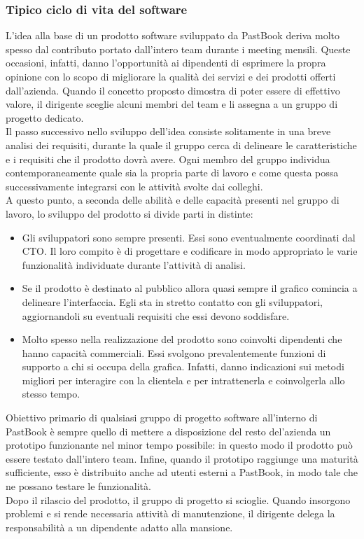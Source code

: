 			\subsubsection{Tipico ciclo di vita del software}
				L'idea alla base di un prodotto software sviluppato da PastBook deriva molto spesso dal contributo portato
				dall'intero team durante i meeting mensili. Queste occasioni, infatti, danno l'opportunità ai dipendenti di esprimere
				la propra opinione con lo scopo di migliorare la qualità dei servizi e dei prodotti offerti dall'azienda. Quando il
				concetto proposto dimostra di poter essere di effettivo valore, il dirigente sceglie alcuni membri del team e li
				assegna a un gruppo di progetto dedicato.\\
				Il passo successivo nello sviluppo dell'idea consiste solitamente in una breve analisi dei requisiti, durante la
				quale il gruppo cerca di delineare le caratteristiche e i requisiti che il prodotto dovrà avere. Ogni membro del
				gruppo individua contemporaneamente quale sia la propria parte di lavoro e come questa possa successivamente
				integrarsi con le attività svolte dai colleghi.\\
				A questo punto, a seconda delle abilità e delle capacità presenti nel gruppo di lavoro, lo sviluppo del prodotto
				si divide parti in distinte:
				\begin{itemize}
					\item Gli sviluppatori sono sempre presenti. Essi sono eventualmente coordinati dal CTO. Il loro compito è
					di progettare e codificare in modo appropriato le varie funzionalità individuate durante l'attività di
					analisi.
					\item Se il prodotto è destinato al pubblico allora quasi sempre il grafico comincia a delineare
					l'interfaccia. Egli sta in stretto contatto con gli sviluppatori, aggiornandoli su eventuali requisiti
					che essi devono soddisfare.
					\item Molto spesso nella realizzazione del prodotto sono coinvolti dipendenti che hanno capacità commerciali.
					Essi svolgono prevalentemente funzioni di supporto a chi si occupa della grafica. Infatti, danno indicazioni
					sui metodi migliori per interagire con la clientela e per intrattenerla e coinvolgerla allo stesso tempo.
				\end{itemize}
				Obiettivo primario di qualsiasi gruppo di progetto software all'interno di PastBook è sempre quello di mettere a
				disposizione del resto del'azienda un prototipo funzionante nel minor tempo possibile: in questo modo il prodotto può
				essere testato dall'intero team. Infine, quando il prototipo raggiunge una maturità sufficiente, esso è distribuito
				anche ad utenti esterni a PastBook, in modo tale che ne possano testare le funzionalità.\\
				Dopo il rilascio del prodotto, il gruppo di progetto si scioglie. Quando insorgono problemi e si rende necessaria
				attività di manutenzione, il dirigente delega la responsabilità a un dipendente adatto alla mansione.
				
